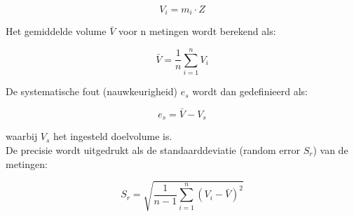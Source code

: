 \begin{equation} V_i = m_i \cdot Z \end{equation}

Het gemiddelde volume $\bar{V}$ voor n metingen wordt berekend als:

\begin{equation} \bar{V} = \frac{1}{n} \sum_{i=1}^{n} V_i \end{equation}

De systematische fout (nauwkeurigheid) $e_s$ wordt dan gedefinieerd als:

\begin{equation} e_s = \bar{V} - V_s \end{equation}

waarbij $V_s$ het ingesteld doelvolume is. 
\\[12pt]De precisie wordt uitgedrukt als de standaarddeviatie (random error $S_r$) van de metingen:

\begin{equation} S_r = \sqrt{ \frac{1}{n-1} \sum_{i=1}^{n} {(V_i - \bar{V})}^2 } \end{equation}